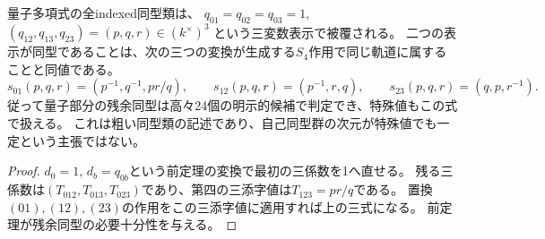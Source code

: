 \begin{corollary}[量子部分の三変数正規形と有限残余作用]\label{cor:quantum-torus-normal-form}
量子多項式の全indexed同型類は、
$q_{01}=q_{02}=q_{03}=1$, $(q_{12},q_{13},q_{23})=(p,q,r)\in(k^\times)^3$
という三変数表示で被覆される。
二つの表示が同型であることは、次の三つの変換が生成する$S_4$作用で同じ軌道に属することと同値である。
\[
 s_{01}(p,q,r)=(p^{-1},q^{-1},pr/q),\qquad
 s_{12}(p,q,r)=(p^{-1},r,q),\qquad
 s_{23}(p,q,r)=(q,p,r^{-1}).
\]
従って量子部分の残余同型は高々24個の明示的候補で判定でき、特殊値もこの式で扱える。
これは粗い同型類の記述であり、自己同型群の次元が特殊値でも一定という主張ではない。
\end{corollary}
\begin{proof}
$d_0=1$, $d_b=q_{0b}$という前定理の変換で最初の三係数を1へ直せる。
残る三係数は$(T_{012},T_{013},T_{023})$であり、第四の三添字値は$T_{123}=pr/q$である。
置換$(01),(12),(23)$の作用をこの三添字値に適用すれば上の三式になる。
前定理が残余同型の必要十分性を与える。
\end{proof}
